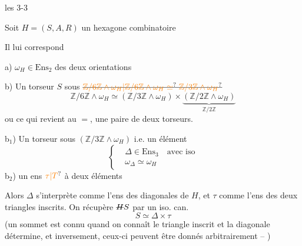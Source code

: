 \begin{flushright}
les  3-3
\end{flushright}

Soit $H=(S,A,R)$ un hexagone combinatoire


Il lui correspond

a) $\omega_H\in\mathrm{Ens}_2$  des deux orientations

b) Un torseur $S$ sous $\deleted{\unsure{\mathbb Z/6\mathbb Z\wedge\omega_H|\mathbb Z/6\mathbb Z\wedge\omega_H\simeq}\;\unsure{\mathbb Z/3\mathbb Z\wedge\omega_H}}$
\[
\mathbb Z/6\mathbb Z\wedge\omega_H \simeq
(\mathbb Z/3\mathbb Z\wedge\omega_H)\times
\underbrace{(\mathbb Z/2\mathbb Z\wedge\omega_H)}_{\mathbb Z/2\mathbb Z}
\]
ou ce qui revient au $=$, une paire de deux torseurs.

b$_1$) Un torseur sous $(\mathbb Z/3\mathbb Z\wedge\omega_H)$ i.e. un  élément
\[
\left\{\begin{aligned}
&\Delta\in\mathrm{Ens}_3\quad\text{avec iso}\\
&\omega_\Delta\simeq\omega_H
\end{aligned}\right.
\]
b$_2$) un ens $\unsure{\tau|T}$ à deux éléments

Alors $\Delta$ s'interprète comme l'ens des  diagonales\unsure{,} de $H$, et $\tau$ comme l'ens des deux triangles inscrits. On récupère $\deleted{H}S$ par un iso. can.
\[
S\simeq\Delta\times\tau
\]
(un sommet est connu quand on connaît le triangle inscrit et la diagonale  détermine, et inversement, ceux-ci peuvent être donnés arbitrairement -- )

